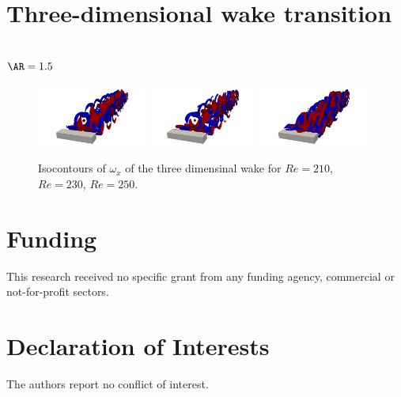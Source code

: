 \documentclass{jfm}
\begin{document}
\section{Three-dimensional wake transition }

\subsection{$\AR=1.5$}

\begin{figure}
  \centering
  \includegraphics[trim={12cm 0 12cm 0},clip,width=0.32\textwidth]{./fig/Wake/AR1.5Re210.png}   
  \includegraphics[trim={12cm 0 12cm 0},clip,width=0.32\textwidth]{./fig/Wake/AR1.5Re230.png} 
  \includegraphics[trim={12cm 0 12cm 0},clip,width=0.32\textwidth]{./fig/Wake/AR1.5Re250.png}
  \caption{Isocontours of $\omega_x$ of the three dimensinal wake for $Re=210$, $Re=230$, $Re=250$.}
  \label{fig:wake1.5}
\end{figure}  

\section*{Funding} 
This research received no specific grant from any funding agency, commercial or not-for-profit sectors.

\section*{Declaration of Interests} 
The authors report no conflict of interest.




\end{document}
